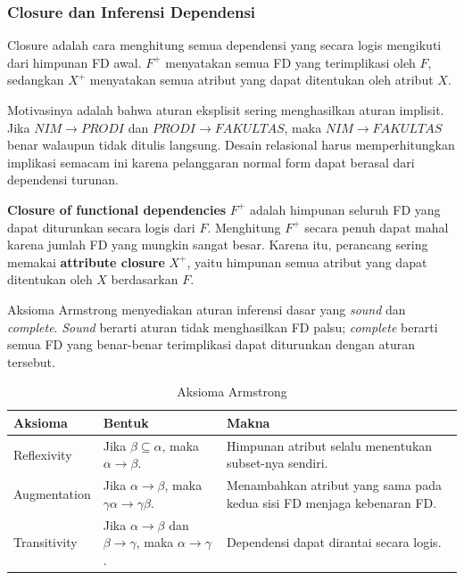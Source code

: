 \subsubsection{Closure dan Inferensi Dependensi}

\begin{jawab}
Closure adalah cara menghitung semua dependensi yang secara logis mengikuti dari himpunan FD awal. \(F^+\) menyatakan semua FD yang terimplikasi oleh \(F\), sedangkan \(X^+\) menyatakan semua atribut yang dapat ditentukan oleh atribut \(X\).
\end{jawab}

Motivasinya adalah bahwa aturan eksplisit sering menghasilkan aturan implisit. Jika \(NIM \rightarrow PRODI\) dan \(PRODI \rightarrow FAKULTAS\), maka \(NIM \rightarrow FAKULTAS\) benar walaupun tidak ditulis langsung. Desain relasional harus memperhitungkan implikasi semacam ini karena pelanggaran normal form dapat berasal dari dependensi turunan.

\textbf{Closure of functional dependencies} \(F^+\) adalah himpunan seluruh FD yang dapat diturunkan secara logis dari \(F\). Menghitung \(F^+\) secara penuh dapat mahal karena jumlah FD yang mungkin sangat besar. Karena itu, perancang sering memakai \textbf{attribute closure} \(X^+\), yaitu himpunan semua atribut yang dapat ditentukan oleh \(X\) berdasarkan \(F\).

Aksioma Armstrong menyediakan aturan inferensi dasar yang \textit{sound} dan \textit{complete}. \textit{Sound} berarti aturan tidak menghasilkan FD palsu; \textit{complete} berarti semua FD yang benar-benar terimplikasi dapat diturunkan dengan aturan tersebut.

\begin{table}[H]
\centering
\begin{tabularx}{\textwidth}{|L{0.24\textwidth}|L{0.28\textwidth}|X|}
\hline
\textbf{Aksioma} & \textbf{Bentuk} & \textbf{Makna} \\
\hline
Reflexivity & Jika \(\beta \subseteq \alpha\), maka \(\alpha \rightarrow \beta\). & Himpunan atribut selalu menentukan subset-nya sendiri. \\
\hline
Augmentation & Jika \(\alpha \rightarrow \beta\), maka \(\gamma\alpha \rightarrow \gamma\beta\). & Menambahkan atribut yang sama pada kedua sisi FD menjaga kebenaran FD. \\
\hline
Transitivity & Jika \(\alpha \rightarrow \beta\) dan \(\beta \rightarrow \gamma\), maka \(\alpha \rightarrow \gamma\). & Dependensi dapat dirantai secara logis. \\
\hline
\end{tabularx}
\caption{Aksioma Armstrong}
\label{tab:armstrong}
\end{table}

